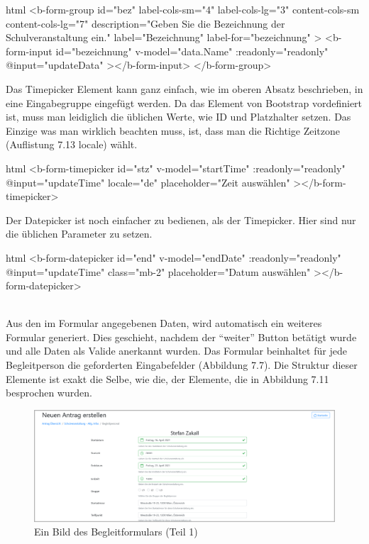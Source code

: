 \begin{code}{html}
	<b-form-group
        id="bez"
        label-cols-sm="4"
        label-cols-lg="3"
        content-cols-sm
        content-cols-lg="7"
        description="Geben Sie die Bezeichnung der Schulveranstaltung ein."
        label="Bezeichnung"
        label-for="bezeichnung"
    >
        <b-form-input
            id="bezeichnung"
            v-model="data.Name"
            :readonly="readonly"
            @input="updateData"
        ></b-form-input>
    </b-form-group>
\end{code}
Das Timepicker Element kann ganz einfach, wie im oberen Absatz beschrieben, in eine Eingabegruppe eingefügt werden. Da das Element von Bootstrap vordefiniert ist, muss man leidiglich die üblichen Werte, wie ID und Platzhalter setzen. Das Einzige was man wirklich beachten muss, ist, dass man die Richtige Zeitzone (Auflistung 7.13 locale) wählt.
\begin{code}{html}
	<b-form-timepicker
		id="stz"
		v-model="startTime"
		:readonly="readonly"
		@input="updateTime"
		locale="de"
		placeholder="Zeit auswählen"
  	></b-form-timepicker>
\end{code}
Der Datepicker ist noch einfacher zu bedienen, als der Timepicker. Hier sind nur die üblichen Parameter zu setzen.
\begin{code}{html}
	<b-form-datepicker
		id="end"
		v-model="endDate"
		:readonly="readonly"
		@input="updateTime"
		class="mb-2"
		placeholder="Datum auswählen"
  	></b-form-datepicker>
\end{code}
	\label{list:bspinputgroup} ~\\
Aus den im Formular angegebenen Daten, wird automatisch ein weiteres Formular generiert. Dies geschieht, nachdem der \enquote{weiter} Button betätigt wurde und alle Daten als Valide anerkannt wurden. Das Formular beinhaltet für jede Begleitperson die geforderten Eingabefelder (Abbildung 7.7). Die Struktur dieser Elemente ist exakt die Selbe, wie die, der Elemente, die in Abbildung 7.11 besprochen wurden. 
\begin{figure}[H]
	\centering
	\includegraphics[width=1\linewidth]{images/website/schul_3_1}
	\caption[Neuer Schulantrag]{Ein Bild des Begleitformulars (Teil 1)}
	\label{fig:schulantrag3}
\end{figure}

